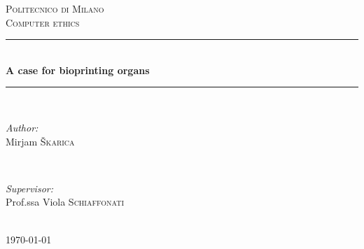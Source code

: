 \documentclass[12pt]{article} %
\begin{document}

\begin{titlepage}

\newcommand{\HRule}{\rule{\linewidth}{0.5mm}} %

\center %

\textsc{\LARGE Politecnico di Milano}\\[1.5cm] %
\textsc{\large Computer ethics}\\[0.5cm] %

\HRule \\[0.4cm]
{ \huge \bfseries A case for bioprinting organs}\\[0.4cm] %
\HRule \\[1.5cm]

\begin{minipage}{0.4\textwidth}
\begin{flushleft} \large
\emph{Author:}\\
Mirjam \textsc{Škarica} %
\end{flushleft}
\end{minipage}
~
\begin{minipage}{0.4\textwidth}
\begin{flushright} \large
\emph{Supervisor:} \\
Prof.ssa Viola \textsc{Schiaffonati} %
\end{flushright}
\end{minipage}\\[4cm]

{\large \today}\\[3cm] %


\vfill %

\end{titlepage}

\end{document}
